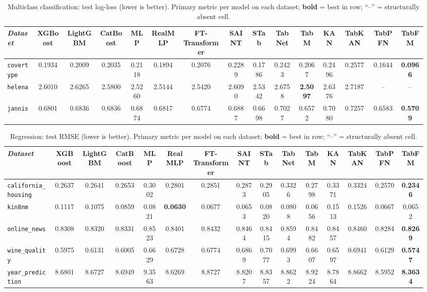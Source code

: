 \begin{landscape}
\begin{table}[htbp]
\centering
\footnotesize
\setlength{\tabcolsep}{3pt}
\caption[Multiclass classification: complete results]{Multiclass classification: test log-loss (lower is better). Primary metric per model on each dataset; \textbf{bold} = best in row; ``--'' = structurally absent cell.}
\label{tab:app-multiclasse}
\begin{tabular}{lcccccccccccccc}
\toprule
\emph{Dataset} & XGBoost & LightGBM & CatBoost & MLP & RealMLP & FT-Transformer & SAINT & STab & TabNet & TabM & KAN & TabKAN & TabPFN & TabFM \\
\midrule
\texttt{covertype} & 0.1934 & 0.2009 & 0.2035 & 0.2118 & 0.1894 & 0.2076 & 0.2289 & 0.1786 & 0.2423 & 0.2067 & 0.2496 & 0.2577 & 0.1644 & \textbf{0.0966} \\
\texttt{helena} & 2.6010 & 2.6265 & 2.5800 & 2.5260 & 2.5144 & 2.5420 & 2.6090 & 2.5342 & 2.6758 & \textbf{2.5097} & 2.6376 & 2.7187 & -- & -- \\
\texttt{jannis} & 0.6801 & 0.6836 & 0.6836 & 0.6874 & 0.6817 & 0.6774 & 0.6887 & 0.6698 & 0.7027 & 0.6572 & 0.7080 & 0.7257 & 0.6583 & \textbf{0.5709} \\
\bottomrule
\end{tabular}
\end{table}

\begin{table}[htbp]
\centering
\footnotesize
\setlength{\tabcolsep}{3pt}
\caption[Regression: complete results]{Regression: test RMSE (lower is better). Primary metric per model on each dataset; \textbf{bold} = best in row; ``--'' = structurally absent cell.}
\label{tab:app-regressao}
\begin{tabular}{lcccccccccccccc}
\toprule
\emph{Dataset} & XGBoost & LightGBM & CatBoost & MLP & RealMLP & FT-Transformer & SAINT & STab & TabNet & TabM & KAN & TabKAN & TabPFN & TabFM \\
\midrule
\texttt{california\_\allowbreak housing} & 0.2637 & 0.2641 & 0.2653 & 0.3002 & 0.2801 & 0.2851 & 0.2873 & 0.2905 & 0.3326 & 0.2798 & 0.3371 & 0.3324 & 0.2570 & \textbf{0.2346} \\
\texttt{kin8nm} & 0.1117 & 0.1075 & 0.0859 & 0.0821 & \textbf{0.0630} & 0.0677 & 0.0653 & 0.0820 & 0.0808 & 0.0656 & 0.1513 & 0.1526 & 0.0667 & 0.0652 \\
\texttt{online\_news} & 0.8308 & 0.8320 & 0.8331 & 0.8523 & 0.8401 & 0.8432 & 0.8464 & 0.8415 & 0.8594 & 0.8482 & 0.8457 & 0.8460 & 0.8284 & \textbf{0.8269} \\
\texttt{wine\_quality} & 0.5975 & 0.6131 & 0.6005 & 0.6629 & 0.6728 & 0.6774 & 0.6869 & 0.7077 & 0.6993 & 0.6607 & 0.6597 & 0.6941 & 0.6129 & \textbf{0.5747} \\
\texttt{year\_\allowbreak prediction} & 8.6801 & 8.6727 & 8.6949 & 9.3563 & 8.6269 & 8.8727 & 8.8207 & 8.8357 & 8.8622 & 8.9224 & 8.7864 & 8.8662 & 8.5952 & \textbf{8.3634} \\
\bottomrule
\end{tabular}
\end{table}

\end{landscape}

